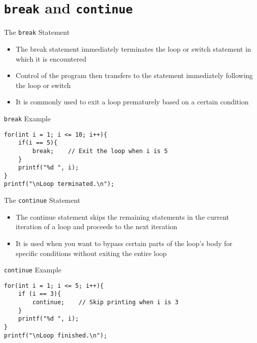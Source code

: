 \documentclass[12pt, aspectratio=169]{beamer}
\begin{document}
    \section{\texttt{break} and \texttt{continue}}

    \begin{frame}{The \texttt{break} Statement}
        \begin{itemize}
            \item The break statement immediately terminates the loop or switch statement in which it is encountered
            \item Control of the program then transfers to the statement immediately following the loop or switch
            \item It is commonly used to exit a loop prematurely based on a certain condition
        \end{itemize}
    \end{frame}


    \begin{frame}[fragile]{\texttt{break} Example}
        \begin{verbatim}
for(int i = 1; i <= 10; i++){
    if(i == 5){
        break;    // Exit the loop when i is 5
    }
    printf("%d ", i);
}
printf("\nLoop terminated.\n");
        \end{verbatim}
    \end{frame}


    \begin{frame}{The \texttt{continue} Statement}
        \begin{itemize}
            \item The continue statement skips the remaining statements in the current iteration of a loop and proceeds to the next iteration
            \item It is used when you want to bypass certain parts of the loop's body for specific conditions without exiting the entire loop
        \end{itemize}
    \end{frame}


    \begin{frame}[fragile]{\texttt{continue} Example}
        \begin{verbatim}
for(int i = 1; i <= 5; i++){
    if (i == 3){
        continue;    // Skip printing when i is 3
    }
    printf("%d ", i);
}
printf("\nLoop finished.\n");
        \end{verbatim}
    \end{frame}
\end{document}
